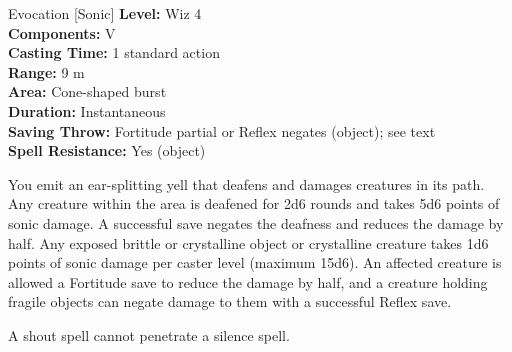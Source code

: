{Evocation [Sonic]}
{
	\textbf{Level:}
	Wiz 4\\
	\textbf{Components:}
	V\\
	\textbf{Casting Time:}
	1 standard action\\
	\textbf{Range:}
	9 m\\
	\textbf{Area:}
	Cone-shaped burst\\
	\textbf{Duration:}
	Instantaneous\\
	\textbf{Saving Throw:}
	Fortitude partial or Reflex negates (object); see text\\
	\textbf{Spell Resistance:}
	Yes (object)\\
}
{
	You emit an ear-splitting yell that deafens and damages creatures in its path. Any creature within the area is deafened for 2d6 rounds and takes 5d6 points of sonic damage. A successful save negates the deafness and reduces the damage by half. Any exposed brittle or crystalline object or crystalline creature takes 1d6 points of sonic damage per caster level (maximum 15d6). An affected creature is allowed a Fortitude save to reduce the damage by half, and a creature holding fragile objects can negate damage to them with a successful Reflex save.

	A shout spell cannot penetrate a silence spell.

}
